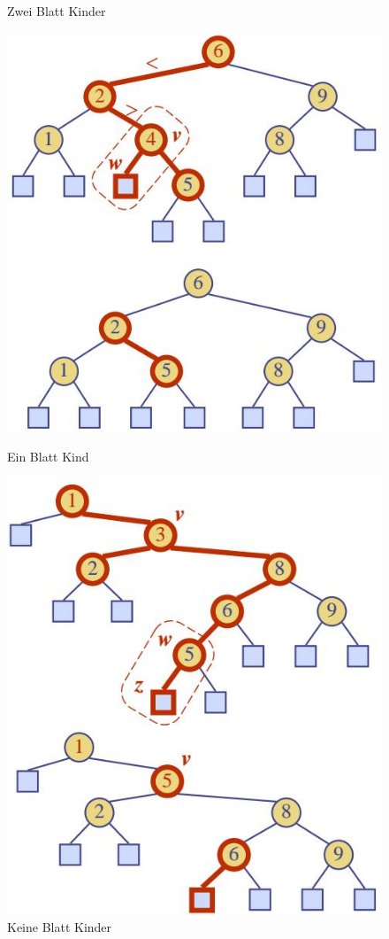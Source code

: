 \begin{description}
\begin{itemize}
\begin{figure}[ht!]
\begin{minipage}[t]{0.4\textwidth}
				\caption{Zwei Blatt Kinder}
				\label{fig:searchtreeinsert1}
			\end{minipage}
			\begin{minipage}[t]{0.4\textwidth}
				\centering
				\includegraphics[width=0.9\linewidth]{images/search_tree_delete_2}
				\caption{Ein Blatt Kind}
				\label{fig:searchtreeinsert2}
			\end{minipage}
			\begin{minipage}[t]{0.4\textwidth}
				\centering
				\includegraphics[width=0.9\linewidth]{images/search_tree_delete_3}
				\caption{Keine Blatt Kinder}
				\label{fig:searchtreeinsert1}
			\end{minipage}
		\end{figure}
	\end{itemize}
\end{description}
